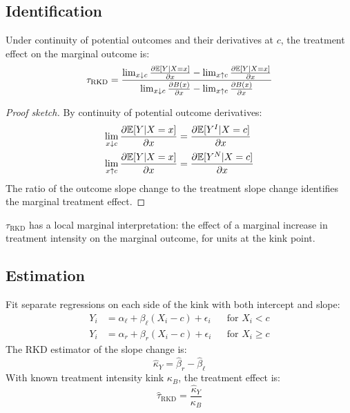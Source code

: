 \subsection{Identification}

\begin{theorem}
\label{thm:sharp_rkd_id}
Under continuity of potential outcomes and their derivatives at $c$, the treatment effect on the marginal outcome is:
\begin{equation}
    \tau_{\text{RKD}} = \frac{\lim_{x \downarrow c} \frac{\partial \mathbb{E}[Y|X=x]}{\partial x} - \lim_{x \uparrow c} \frac{\partial \mathbb{E}[Y|X=x]}{\partial x}}{\lim_{x \downarrow c} \frac{\partial B(x)}{\partial x} - \lim_{x \uparrow c} \frac{\partial B(x)}{\partial x}}
    \label{eq:rkd_tau}
\end{equation}
\end{theorem}

\begin{proof}[Proof sketch]
By continuity of potential outcome derivatives:
\begin{align}
    \lim_{x \downarrow c} \frac{\partial \mathbb{E}[Y|X=x]}{\partial x} &= \frac{\partial \mathbb{E}[Y^I|X=c]}{\partial x} \\
    \lim_{x \uparrow c} \frac{\partial \mathbb{E}[Y|X=x]}{\partial x} &= \frac{\partial \mathbb{E}[Y^N|X=c]}{\partial x}
\end{align}
The ratio of the outcome slope change to the treatment slope change identifies the marginal treatment effect.
\end{proof}

\begin{remark}[Interpretation]
$\tau_{\text{RKD}}$ has a local marginal interpretation: the effect of a marginal increase in treatment intensity on the marginal outcome, for units at the kink point.
\end{remark}

\subsection{Estimation}

\begin{definition}
\label{def:local_linear_rkd}
Fit separate regressions on each side of the kink with both intercept and slope:
\begin{align}
    Y_i &= \alpha_\ell + \beta_\ell (X_i - c) + \epsilon_i && \text{for } X_i < c \\
    Y_i &= \alpha_r + \beta_r (X_i - c) + \epsilon_i && \text{for } X_i \geq c
\end{align}
The RKD estimator of the slope change is:
\begin{equation}
    \hat{\kappa}_Y = \hat{\beta}_r - \hat{\beta}_\ell
\end{equation}
With known treatment intensity kink $\kappa_B$, the treatment effect is:
\begin{equation}
    \hat{\tau}_{\text{RKD}} = \frac{\hat{\kappa}_Y}{\kappa_B}
\end{equation}
\end{definition}

